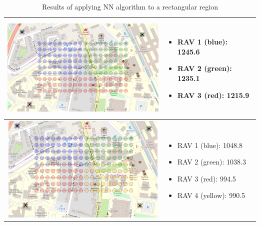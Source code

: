 \begin{table}[H]
\begin{tabular}{ | c | m{5cm} | }
    \begin{minipage}[c][53mm][c]{.6\textwidth}
      \includegraphics[width=\linewidth, height=51mm]{Chapters/MultiAgentCoverage/MultipleTravellingSalesman/Figs/Rectangle/ThreeAgent.PNG}
    \end{minipage}
    &
    \begin{itemize}[leftmargin=*]
    \item[] RAV 1 (blue): 1245.6
    \item[] RAV 2 (green): 1235.1
    \item[] RAV 3 (red): 1215.9
    \end{itemize}
    \\
    \hline
    
    \begin{minipage}[c][53mm][c]{.6\textwidth}
      \includegraphics[width=\linewidth, height=51mm]{Chapters/MultiAgentCoverage/MultipleTravellingSalesman/Figs/Rectangle/FourAgent.PNG}
    \end{minipage}
    &
    \begin{itemize}[leftmargin=*]
    \item[] RAV 1 (blue): 1048.8
    \item[] RAV 2 (green): 1038.3
    \item[] RAV 3 (red): 994.5
    \item[] RAV 4 (yellow): 990.5
    \end{itemize}

    \\
    \hline
  \end{tabular}
  \caption{Results of applying NN algorithm to a rectangular region}\label{table:NNAlgoResultsRect}
\end{table}




